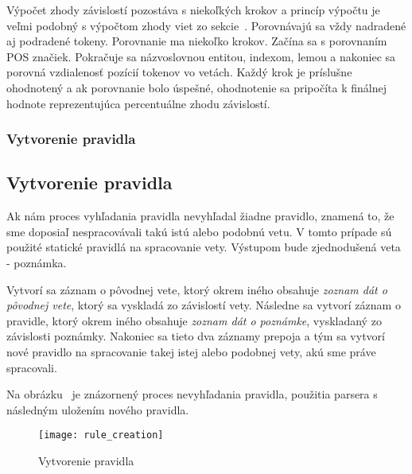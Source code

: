 Výpočet zhody závislostí pozostáva s niekoľkých krokov a princíp výpočtu je veľmi podobný s výpočtom zhody viet zo sekcie~. Porovnávajú sa vždy nadradené aj podradené tokeny. Porovnanie ma niekoľko krokov. Začína sa s porovnaním POS značiek. Pokračuje sa názvoslovnou entitou, indexom, lemou a nakoniec sa porovná vzdialenosť pozícií tokenov vo vetách. Každý krok je príslušne ohodnotený a ak porovnanie bolo úspešné, ohodnotenie sa pripočíta k finálnej hodnote reprezentujúca percentuálne zhodu závislostí.

%
%
{
	\subsubsection{Vytvorenie pravidla}
}
{
	\subsection{Vytvorenie pravidla}
}
\label{subsubsection:rule_creation}
Ak nám proces vyhľadania pravidla nevyhľadal žiadne pravidlo, znamená to, že sme doposiaľ nespracovávali takú istú alebo podobnú vetu. V tomto prípade sú použité statické pravidlá na spracovanie vety. Výstupom bude zjednodušená veta - poznámka.

Vytvorí sa záznam o pôvodnej vete, ktorý okrem iného obsahuje \textit{zoznam dát o pôvodnej vete}, ktorý sa vyskladá zo závislostí vety. Následne sa vytvorí záznam o pravidle, ktorý okrem iného obsahuje \textit{zoznam dát o poznámke}, vyskladaný zo závislosti poznámky. Nakoniec sa tieto dva záznamy prepoja a tým sa vytvorí nové pravidlo na spracovanie takej istej alebo podobnej vety, akú sme práve spracovali.

Na obrázku~ je znázornený proces nevyhľadania pravidla, použitia parsera s následným uložením nového pravidla.

\begin{figure}[H]
	\begin{center}\texttt{[image: rule\_creation]}\end{center}
	\caption[Vytvorenie pravidla]{Vytvorenie pravidla}\label{fig:rule_creation}
\end{figure}